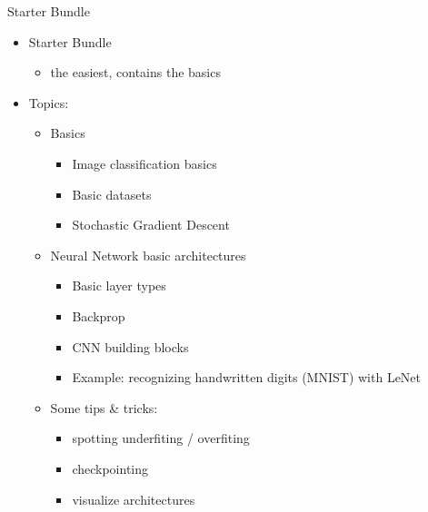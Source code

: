 \documentclass[ignorenonframetext,]{beamer}
\providecommand{\tightlist}{%
  \setlength{\itemsep}{0pt}\setlength{\parskip}{0pt}}
\begin{document}
\begin{frame}{Starter Bundle}

\begin{itemize}
\tightlist
\item
  Starter Bundle

  \begin{itemize}
  \tightlist
  \item
    the easiest, contains the basics
  \end{itemize}
\item
  Topics:

  \begin{itemize}
  \tightlist
  \item
    Basics

    \begin{itemize}
    \tightlist
    \item
      Image classification basics
    \item
      Basic datasets
    \item
      Stochastic Gradient Descent
    \end{itemize}
  \item
    Neural Network basic architectures

    \begin{itemize}
    \tightlist
    \item
      Basic layer types
    \item
      Backprop
    \item
      CNN building blocks
    \item
      Example: recognizing handwritten digits (MNIST) with LeNet
    \end{itemize}
  \item
    Some tips \& tricks:

    \begin{itemize}
    \tightlist
    \item
      spotting underfiting / overfiting
    \item
      checkpointing
    \item
      visualize architectures
    \end{itemize}
  \end{itemize}
\end{itemize}

\end{frame}
\end{document}
